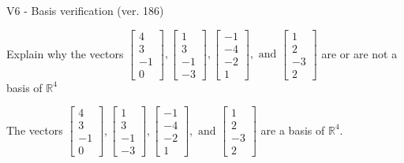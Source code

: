 \begin{exercise}
  \begin{exerciseTitle}V6 - Basis verification (ver. 186)\end{exerciseTitle}
  \begin{exerciseStatement}
    Explain why the vectors \(\left[\begin{array}{r}
4 \\
3 \\
-1 \\
0
\end{array}\right] , \left[\begin{array}{r}
1 \\
3 \\
-1 \\
-3
\end{array}\right] , \left[\begin{array}{r}
-1 \\
-4 \\
-2 \\
1
\end{array}\right] , \text{ and } \left[\begin{array}{r}
1 \\
2 \\
-3 \\
2
\end{array}\right]\) are or are not a basis of \(\mathbb{R}^4\)	


  \end{exerciseStatement}
  \begin{exerciseAnswer}
   The vectors \(\left[\begin{array}{r}
4 \\
3 \\
-1 \\
0
\end{array}\right] , \left[\begin{array}{r}
1 \\
3 \\
-1 \\
-3
\end{array}\right] , \left[\begin{array}{r}
-1 \\
-4 \\
-2 \\
1
\end{array}\right] , \text{ and } \left[\begin{array}{r}
1 \\
2 \\
-3 \\
2
\end{array}\right]\) 
  	 are  a basis of \(\mathbb{R}^4\).
  


  \end{exerciseAnswer}
\end{exercise}